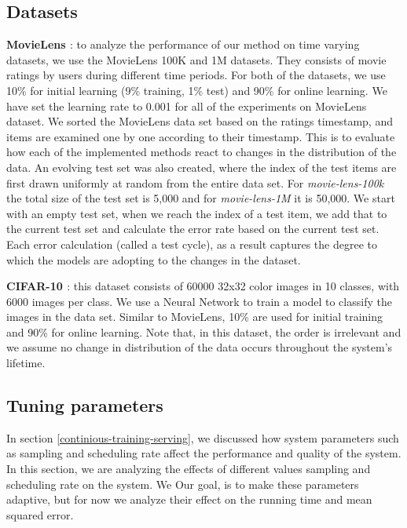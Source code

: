 \documentclass{sig-alternate-05-2015}
\begin{document}
\subsection{Datasets}
\textbf{MovieLens \cite{harper2016movielens}}: to analyze the performance of our method on time varying datasets, we use the MovieLens 100K and 1M datasets. 
They consists of movie ratings by users during different time periods. 
For both of the datasets, we use 10\% for initial learning (9\% training, 1\% test) and 90\% for online learning. 
We have set the learning rate to 0.001 for all of the experiments on MovieLens dataset.
We sorted the MovieLens data set based on the ratings timestamp, and items are examined one by one according to their timestamp.
This is to evaluate how each of the implemented methods react to changes in the distribution of the data.
An evolving test set was also created, where the index of the test items are first drawn uniformly at random from the entire data set.
For \textit{movie-lens-100k} the total size of the test set is 5,000 and for \textit{movie-lens-1M} it is 50,000.
We start with an empty test set, when we reach the index of a test item, we add that to the current test set and calculate the error rate based on the current test set.
Each error calculation (called a test cycle), as a result captures the degree to which the models are adopting to the changes in the dataset.

\textbf{CIFAR-10 \cite{krizhevsky2009learning}}: this dataset consists of 60000 32x32 color images in 10 classes, with 6000 images per class. We use a Neural Network to train a model to classify the images in the data set. Similar to MovieLens, 10\% are used for initial training and 90\% for online learning. Note that, in this dataset, the order is irrelevant and we assume no change in distribution of the data occurs throughout the system's lifetime. 

\subsection{Tuning parameters} \label{tuning}
In section \ref{continious-training-serving}, we discussed how system parameters such as sampling and scheduling rate affect the performance and quality of the system.
In this section, we are analyzing the effects of different values sampling and scheduling rate on the system.
We 
Our goal, is to make these parameters adaptive, but for now we analyze their effect on the running time and mean squared error. 
\end{document}
